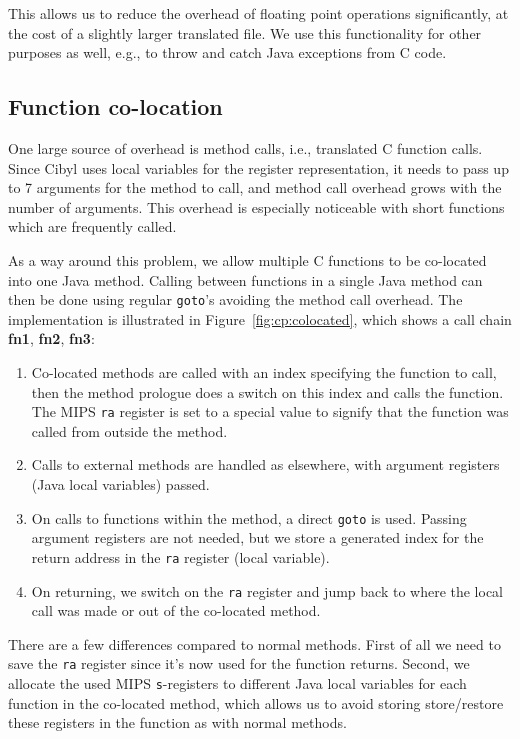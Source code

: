 This allows us to reduce the overhead of floating point operations
significantly, at the cost of a slightly larger translated file. We use this
functionality for other purposes as well, e.g., to throw and catch Java
exceptions from C code.

\subsection{Function co-location}
One large source of overhead is method calls, i.e., translated C function
calls. Since Cibyl uses local variables for the register representation, it
needs to pass up to 7 arguments for the method to call, and method call
overhead grows with the number of arguments. This overhead is especially
noticeable with short functions which are frequently called.

As a way around this problem, we allow multiple C functions to be co-located
into one Java method. Calling between functions in a single Java method can
then be done using regular \texttt{goto}'s avoiding the method call overhead.
The implementation is illustrated in Figure~\ref{fig:cp:colocated}, which
shows a call chain \textbf{fn1}, \textbf{fn2}, \textbf{fn3}:

\begin{enumerate}
\item Co-located methods are called with an index specifying the function to
  call, then the method prologue does a switch on this index and calls the
  function. The MIPS \texttt{ra} register is set to a special value to signify
  that the function was called from outside the method.
\item Calls to external methods are handled as elsewhere, with argument
  registers (Java local variables) passed.
\item On calls to functions within the method, a direct \texttt{goto} is used.
  Passing argument registers are not needed, but we store a generated index
  for the return address in the \texttt{ra} register (local variable).
\item On returning, we switch on the \texttt{ra} register and jump back to
  where the local call was made or out of the co-located method.
\end{enumerate}

There are a few differences compared to normal methods. First of all we need
to save the \texttt{ra} register since it's now used for the function
returns. Second, we allocate the used MIPS \texttt{s}-registers to different
Java local variables for each function in the co-located method, which allows
us to avoid storing store/restore these registers in the function as with
normal methods.

